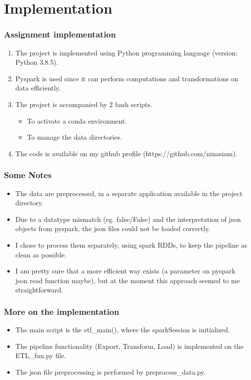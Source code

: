 \documentclass{beamer}
\begin{document}
\section{Implementation}
\begin{frame}
\frametitle{Assignment implementation}
\begin{enumerate}
\item The project is implemented using Python programming language (version: Python 3.8.5).
\item Pyspark is used since it can perform computations and transformations on data efficiently.
\item The project is accompanied by 2 bash scripts. 
\begin{itemize}
\item To activate a conda environment.
\item To manage the data directories.
\end{itemize}
\item The code is available on my github profile (https://github.com/ninasiam).
\end{enumerate}
\end{frame}

\begin{frame}
\frametitle{Some Notes}
\begin{itemize}
\item The data are preprocessed, in a separate application available in the project directory.
\item Due to a datatype mismatch (eg. false/False) and the interpretation of json objects from pyspark, the json files could not be loaded correctly.
\item I chose to process them separately, using spark RDDs, to keep the pipeline as clean as possible.
\item I am pretty sure that a more efficient way exists (a parameter on pyspark json read function maybe), but at the moment this approach seemed to me straightforward. 
\end{itemize}
\end{frame}

\begin{frame}
\frametitle{More on the implementation}
\begin{itemize}
\item The main script is the etl\_main(), where the sparkSession is initialized.
\item The pipeline functionality (Export, Transform, Load) is implemented on the ETL\_fun.py file.
\item The json file preprocessing is performed by preprocess\_data.py. 
\end{itemize}
\end{frame}
\end{document}
